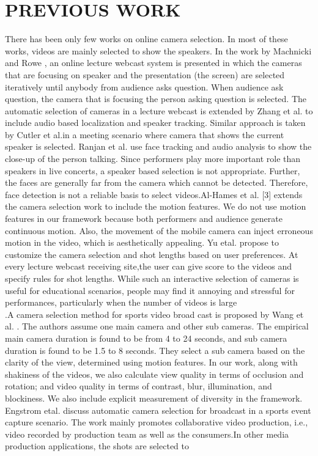 \documentclass{sig-alternate}
\begin{document}
\section{PREVIOUS WORK}
There has been only few works on online camera selection. In most of these works, videos are mainly selected to show the speakers. In the work by Machnicki and Rowe \cite{web:9}, an online lecture
webcast system is presented in which the cameras that are focusing on speaker and the presentation (the screen) are selected iteratively until anybody from audience asks question. When audience ask question, the camera that is focusing the person asking question is selected. The automatic selection of cameras in a lecture webcast is extended by Zhang et al. \cite{web:3} to include audio based localization and speaker tracking. Similar approach is taken by Cutler et al.in a meeting scenario where camera that shows the current speaker is selected. Ranjan et al. \cite{web:12} use face tracking and audio analysis to show the close-up of the person talking. Since performers play more important role than speakers in live concerts, a speaker based selection is not appropriate. Further, the faces are generally far from the camera which cannot be detected. Therefore, face detection is not a reliable basis to select videos.Al-Hames et al. [3] extends the camera selection work to include the motion features. We do not use motion features in our framework because both performers and audience generate continuous motion. Also, the movement of the mobile camera can inject erroneous motion in the video, which is aesthetically appealing. Yu etal. \cite{web:20} propose to customize the camera selection and shot lengths based on user preferences. At every lecture webcast receiving site,the user can give score to the videos and specify rules for shot lengths. While such an interactive selection of cameras is useful for educational scenarios, people may find it annoying and stressful for performances, particularly when the number of videos is large\\
.A camera selection method for sports video broad cast is proposed by Wang et al. \cite{web:16}. The authors assume one main camera and other sub cameras. The empirical main camera duration is found to be from 4 to 24 seconds, and sub camera duration is found to be 1.5 to 8 seconds. They select a sub camera based on the clarity of the view, determined using motion features. In our work, along with shakiness of the videos, we also calculate view quality in terms of occlusion and rotation; and video quality in terms of contrast, blur, illumination, and blockiness. We also include explicit measurement of diversity in the framework. Engstrom etal. \cite{web:7} discuss automatic camera selection for broadcast in a sports event capture scenario. The work mainly promotes collaborative video production, i.e., video recorded by production team as well as the consumers.In other media production applications, the shots are selected to
\end{document}
